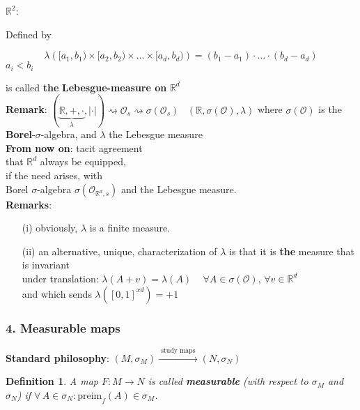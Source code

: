 \documentclass[10pt]{amsart}
\newtheorem{definition}{Definition}
\begin{document}
\begin{multicols*}{2}
$\mathbb{R}^2$:

Defined by

\[
\lambda \left( [a_1, b_1) \times [a_2, b_2) \times \dots \times [a_d, b_d) \right) = (b_1 - a_1) \cdot \dots \cdot (b_d - a_d) 
\]
$a_i < b_i$

is called \textbf{the} \textbf{Lebesgue-measure on} $\mathbb{R}^d$ \\

\textbf{Remark}: $(\underbrace{ \mathbb{R}, +, \cdot}_{\lambda}, |\cdot |) \rightsquigarrow \mathcal{O}_s \rightsquigarrow \sigma(\mathcal{O}_s)$ \quad \quad \, $(\mathbb{R}, \sigma(\mathcal{O}), \lambda)$ where $\sigma(\mathcal{O})$ is the \textbf{Borel}-$\sigma$-algebra, and $\lambda$ the Lebesgue measure \\

\textbf{From now on}: tacit agreement \\
\phantom{From now on} that $\mathbb{R}^d$ always be equipped, \\
\phantom{From now on} if the need arises, with \\
\phantom{From now on} Borel $\sigma$-algebra $\sigma(\mathcal{O}_{\mathbb{R}^d, s})$ and the Lebesgue measure. \\

\textbf{Remarks}: 
\begin{enumerate}
	\item[(i)] obviously, $\lambda$ is a finite measure.
	\item[(ii)]  an alternative, unique, characterization of $\lambda$ is that it is \textbf{the} measure that is invariant \\
	under translation: $\lambda(A + v) = \lambda(A) \quad \, \forall A \in \sigma(\mathcal{O}), \, \forall v \in \mathbb{R}^d$ \\
	and which sends $\lambda([0, 1]^{xd}) = +1$
\end{enumerate}

\subsubsection{4. Measurable maps}

\textbf{Standard philosophy}: $(M, \sigma_{M}) \xrightarrow{ \text{ study maps } } (N, \sigma_N)$

\begin{definition}
	A map $F: M \to N$ is called \textbf{measurable} (with respect to $\sigma_M$ and $\sigma_N$) if $\forall \, A \in \sigma_N : \text{preim}_f(A) \in \sigma_M$.
\end{definition}


\end{multicols*}
\end{document}
